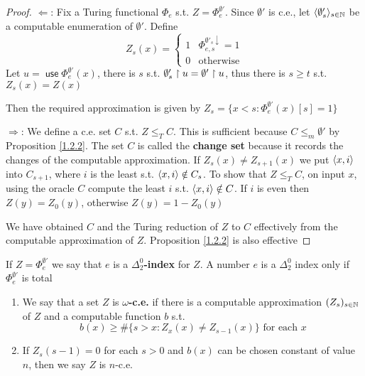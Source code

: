 \documentclass[11pt]{article}
\DeclareMathOperator{\use}{\textsf{use}}
\begin{document}
\begin{proof}
\(\Leftarrow\): Fix a Turing functional \(\Phi_e\) s.t. \(Z=\Phi_e^{\emptyset'}\). Since \(\emptyset'\) is c.e.,
let \(\langle \emptyset'_s\rangle_{s\in\mathbb{N}}\) be a computable enumeration of \(\emptyset'\). Define
\begin{equation*}
Z_s(x)=
\begin{cases}
1&\Phi_{e,s}^{\emptyset'_s\downarrow}=1\\
0&\text{otherwise}
\end{cases}
\end{equation*}
Let \(u=\use\Phi_e^{\emptyset'}(x)\), there is \(s\) s.t. \(\emptyset'_s\upharpoonright u=\emptyset'\upharpoonright u\), thus there is \(s\ge t\)
s.t. \(Z_s(x)=Z(x)\)

Then the required approximation is
given by \(Z_s=\{x<s:\Phi_e^{\emptyset'}(x)[s]=1\}\)

\(\Rightarrow\): We define a c.e. set \(C\) s.t. \(Z\le_TC\). This is sufficient because \(C\le_m\emptyset'\) by
Proposition \ref{1.2.2}. The set \(C\) is called the \textbf{change set} because it records the changes of
the computable approximation. If \(Z_s(x)\neq Z_{s+1}(x)\) we put \(\langle x,i\rangle\) into \(C_{s+1}\),
where \(i\) is the least s.t. \(\langle x,i\rangle\notin C_s\). To show that \(Z\le_TC\), on input \(x\), using the
oracle \(C\) compute the least \(i\) s.t. \(\langle x,i\rangle\notin C\). If \(i\) is even then \(Z(y)=Z_0(y)\),
otherwise \(Z(y)=1-Z_0(y)\)

We have obtained \(C\) and the Turing reduction of \(Z\) to \(C\) effectively from the
computable approximation of \(Z\). Proposition \ref{1.2.2} is also effective
\end{proof}

If \(Z=\Phi_e^{\emptyset'}\) we say that \(e\) is a \textbf{\(\Delta_2^0\)-index} for \(Z\). A number \(e\) is
a \(\Delta_2^0\) index only if \(\Phi_e^{\emptyset'}\) is total

\begin{definition}[]
\begin{enumerate}
\item We say that a set \(Z\) is \textbf{\(\omega\)-c.e.} if there is a computable
approximation \((Z_s)_{s\in\mathbb{N}}\) of \(Z\) and a computable function \(b\) s.t.
\begin{equation*}
b(x)\ge\#\{s>x:Z_x(x)\neq Z_{s-1}(x)\}\text{ for each }x
\end{equation*}
\item If \(Z_s(s-1)=0\) for each \(s>0\) and \(b(x)\) can be chosen constant of value \(n\), then
we say \(Z\) is \(n\)-c.e.
\end{enumerate}
\end{definition}
\end{document}
